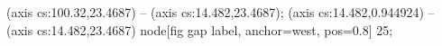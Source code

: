  (axis cs:100.32,23.4687) -- (axis cs:14.482,23.4687);
 (axis cs:14.482,0.944924) -- (axis cs:14.482,23.4687)
  node[fig gap label, anchor=west, pos=0.8] {\texttimes{}25};
